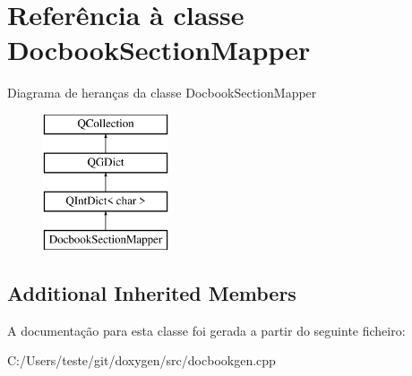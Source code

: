 \hypertarget{class_docbook_section_mapper}{\section{Referência à classe Docbook\-Section\-Mapper}
\label{class_docbook_section_mapper}
}
Diagrama de heranças da classe Docbook\-Section\-Mapper\begin{figure}[H]
\begin{center}
\leavevmode
\includegraphics[height=4.000000cm]{class_docbook_section_mapper}
\end{center}
\end{figure}
\subsection*{Additional Inherited Members}


A documentação para esta classe foi gerada a partir do seguinte ficheiro\-:\begin{DoxyCompactItemize}
\item 
C\-:/\-Users/teste/git/doxygen/src/docbookgen.\-cpp\end{DoxyCompactItemize}
